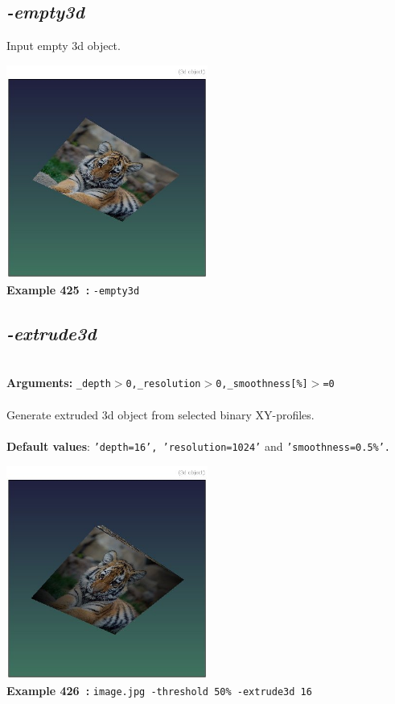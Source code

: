 \documentclass[a4paper,11pt,twoside]{book}
\begin{document}
\subsection{\emph{-empty3d} }\vspace*{-0.5em}
Input empty 3d object.
\begin{center}\includegraphics[keepaspectratio=true,height=7cm,width=\textwidth]{img/gmic_def425.jpg}\\
{\footnotesize \textbf{Example 425~:} \texttt{-empty3d}}
\end{center}

\subsection{\emph{-extrude3d} }\vspace*{-0.5em}
~\\\textbf{Arguments: } 
{\small \texttt{\_depth$>$0,\_resolution$>$0,\_smoothness[\%]$>$=0}}\\~\\
Generate extruded 3d object from selected binary XY-profiles.
~\\~\\\textbf{Default values}: {\small \texttt{'depth=16', 'resolution=1024'} and \texttt{'smoothness=0.5\%'.}}
\begin{center}\includegraphics[keepaspectratio=true,height=7cm,width=\textwidth]{img/gmic_def426.jpg}\\
{\footnotesize \textbf{Example 426~:} \texttt{image.jpg -threshold 50\% -extrude3d 16}}
\end{center}
\end{document}
